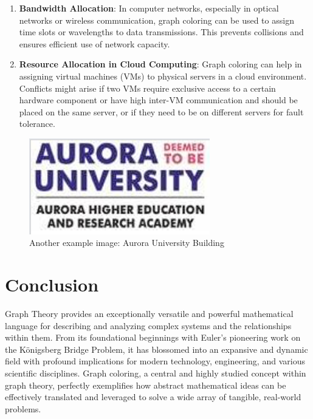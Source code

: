 \documentclass[11pt, a4paper]{article}
\begin{document}
\begin{enumerate}[noitemsep,topsep=3pt,parsep=3pt,partopsep=0pt]
\begin{itemize}
    \end{itemize}
    \item \textbf{Bandwidth Allocation}: In computer networks, especially in optical networks or wireless communication, graph coloring can be used to assign time slots or wavelengths to data transmissions. This prevents collisions and ensures efficient use of network capacity.
    \item \textbf{Resource Allocation in Cloud Computing}: Graph coloring can help in assigning virtual machines (VMs) to physical servers in a cloud environment. Conflicts might arise if two VMs require exclusive access to a certain hardware component or have high inter-VM communication and should be placed on the same server, or if they need to be on different servers for fault tolerance.
\end{enumerate}

\begin{figure}[h!]
    \centering
    \includegraphics[width=0.7\textwidth]{aurora_du.png} %
    \caption{Another example image: Aurora University Building}
    \label{fig:aurora_du}
\end{figure}

\section{Conclusion}
Graph Theory provides an exceptionally versatile and powerful mathematical language for describing and analyzing complex systems and the relationships within them. From its foundational beginnings with Euler's pioneering work on the Königsberg Bridge Problem, it has blossomed into an expansive and dynamic field with profound implications for modern technology, engineering, and various scientific disciplines. Graph coloring, a central and highly studied concept within graph theory, perfectly exemplifies how abstract mathematical ideas can be effectively translated and leveraged to solve a wide array of tangible, real-world problems.
\end{document}
